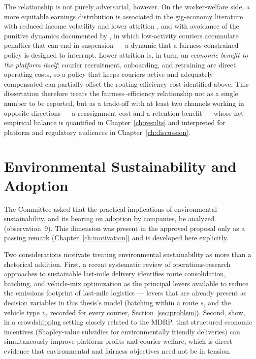 \documentclass[12pt,a4paper]{report}
\begin{document}
The relationship is not purely adversarial, however. On the worker-welfare side, a more equitable earnings distribution is associated in the gig-economy literature with reduced income volatility and lower attrition \citep{liao2020multi}, and with avoidance of the punitive dynamics documented by \citet{canada2023}, in which low-activity couriers accumulate penalties that can end in suspension --- a dynamic that a fairness-constrained policy is designed to interrupt. Lower attrition is, in turn, an \emph{economic benefit to the platform itself}: courier recruitment, onboarding, and retraining are direct operating costs, so a policy that keeps couriers active and adequately compensated can partially offset the routing-efficiency cost identified above. This dissertation therefore treats the fairness--efficiency relationship not as a single number to be reported, but as a trade-off with at least two channels working in opposite directions --- a reassignment cost and a retention benefit --- whose net empirical balance is quantified in Chapter~\ref{ch:results} and interpreted for platform and regulatory audiences in Chapter~\ref{ch:discussion}.

\section{Environmental Sustainability and Adoption}
\label{sec:concept-sustainability}

The Committee asked that the practical implications of environmental sustainability, and its bearing on adoption by companies, be analyzed (observation~9). This dimension was present in the approved proposal only as a passing remark (Chapter~\ref{ch:motivation}) and is developed here explicitly.

Two considerations motivate treating environmental sustainability as more than a rhetorical addition. First, a recent systematic review of operations-research approaches to sustainable last-mile delivery identifies route consolidation, batching, and vehicle-mix optimization as the principal levers available to reduce the emissions footprint of last-mile logistics \citep{moradi2025systematic} --- levers that are already present as decision variables in this thesis's model (batching within a route $s$, and the vehicle type $v_c$ recorded for every courier, Section~\ref{sec:problem}). Second, \citet{bajec2022strategic} show, in a crowdshipping setting closely related to the MDRP, that structured economic incentives (Shapley-value subsidies for environmentally friendly deliveries) can simultaneously improve platform profits and courier welfare, which is direct evidence that environmental and fairness objectives need not be in tension.
\end{document}
